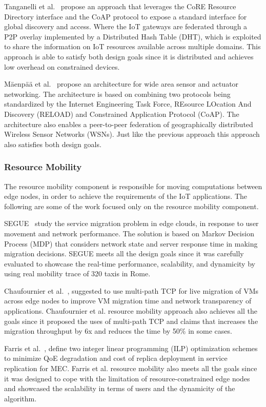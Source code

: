Tanganelli et al.~\cite{8086146} propose an approach that leverages the CoRE Resource Directory interface and the CoAP protocol to expose a standard interface for global discovery and access. Where the IoT gateways are federated through a P2P overlay implemented by a Distributed Hash Table (DHT), which is exploited to share the information on IoT resources available across multiple domains. This approach is able to satisfy both design goals since it is distributed and achieves low overhead on constrained devices.

M{\"a}enp{\"a}{\"a} et al.~\cite{Maenpaa2012} propose an architecture for wide area sensor and actuator networking. The architecture is based on combining two protocols being standardized by the Internet Engineering Task Force, REsource LOcation And Discovery (RELOAD) and Constrained Application Protocol (CoAP). The architecture also enables a peer-to-peer federation of geographically distributed Wireless Sensor Networks (WSNs). Just like the previous approach this approach also satisfies both design goals.

\subsubsection{Resource Mobility}
The resource mobility component is responsible for moving computations between edge nodes, in order to achieve the requirements of the IoT applications. The following are some of the work focused only on the resource mobility component.

SEGUE~\cite{SEGUE} study the service migration problem in edge clouds, in response to user movement and network performance. The solution is based on Markov Decision Process (MDP) that considers network state and server response time in making migration decisions. SEGUE meets all the design goals since it was carefully evaluated to showcase the real-time performance, scalability, and dynamicity by using real mobility trace of 320 taxis in Rome. 

Chaufournier et al.~\cite{Chaufournier:2017}, suggested to use multi-path TCP for live migration of VMs across edge nodes to improve VM migration time and network transparency of applications.  Chaufournier et al. resource mobility approach also achieves all the goals since it proposed the uses of multi-path TCP and claims that increases the migration throughput by 6x and reduces the time by 50\% in some cases.

Farris et al.~\cite{Farris:2017}, define two integer linear programming (ILP) optimization schemes to minimize QoE degradation and cost of replica deployment in service replication for MEC. Farris et al. resource mobility also meets all the goals since it was designed to cope with the limitation of resource-constrained edge nodes and showcased the scalability in terms of users and the dynamicity of the algorithm.

